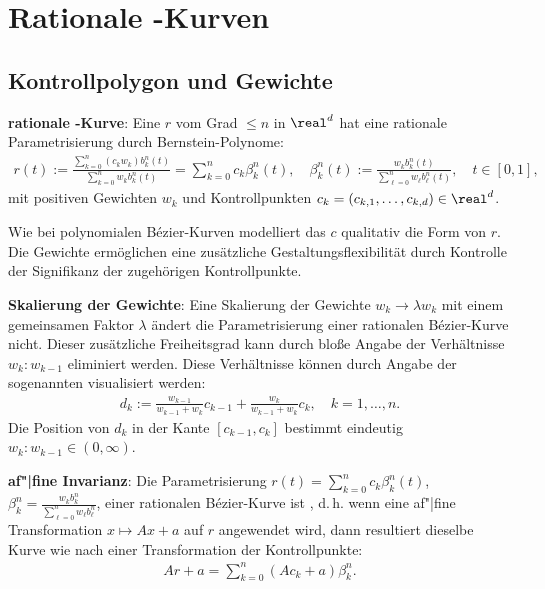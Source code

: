 \chapter{%
    Rationale -Kurven%
}

\section{%
    Kontrollpolygon und Gewichte%
}

\textbf{rationale -Kurve}:
Eine  $r$ vom Grad $\le n$ in $\real^d$ hat eine
rationale Parametrisierung durch Bernstein-Polynome:
\begin{align*}
    r(t) := \frac{\sum_{k=0}^n (c_k w_k) b_k^n(t)}{\sum_{k=0}^n w_k b_k^n(t)}
    =\sum_{k=0}^n c_k \beta_k^n(t),\quad
    \beta_k^n(t) := \frac{w_k b_k^n(t)}{\sum_{\ell=0}^n w_\ell b_\ell^n(t)},\quad t \in [0, 1],
\end{align*}
mit positiven Gewichten $w_k$ und Kontrollpunkten $c_k = (c_{k,1}, \dotsc, c_{k,d}) \in \real^d$.

Wie bei polynomialen Bézier-Kurven modelliert das  $c$ qualitativ
die Form von $r$.
Die Gewichte ermöglichen eine zusätzliche Gestaltungsflexibilität durch
Kontrolle der Signifikanz der zugehörigen Kontrollpunkte.

\linie

\textbf{Skalierung der Gewichte}:
Eine Skalierung der Gewichte $w_k \rightarrow \lambda w_k$ mit einem gemeinsamen Faktor $\lambda$
ändert die Parametrisierung einer rationalen Bézier-Kurve nicht.
Dieser zusätzliche Freiheitsgrad kann durch bloße Angabe der Verhältnisse $w_k : w_{k-1}$
eliminiert werden.
Diese Verhältnisse können durch Angabe der sogenannten 
visualisiert werden:
\begin{align*}
    d_k := \frac{w_{k-1}}{w_{k-1} + w_k} c_{k-1} + \frac{w_k}{w_{k-1} + w_k} c_k,\quad
    k = 1, \dotsc, n.
\end{align*}
Die Position von $d_k$ in der Kante $[c_{k-1}, c_k]$ bestimmt eindeutig
$w_k : w_{k-1} \in (0, \infty)$.

\linie

\textbf{af"|fine Invarianz}:
Die Parametrisierung
$r(t) = \sum_{k=0}^n c_k \beta_k^n(t)$,
$\beta_k^n = \frac{w_k b_k^n}{\sum_{\ell=0}^n w_\ell b_\ell^n}$,
einer rationalen Bézier-Kurve ist , d.\,h. wenn eine af"|fine
Transformation
$x \mapsto Ax + a$
auf $r$ angewendet wird, dann resultiert dieselbe Kurve wie nach einer Transformation der
Kontrollpunkte:
\begin{align*}
    Ar + a = \sum_{k=0}^n (Ac_k + a) \beta_k^n.
\end{align*}

